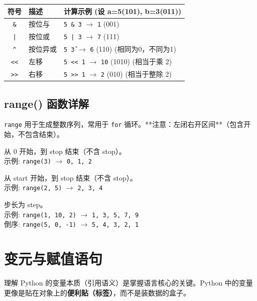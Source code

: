\documentclass[12pt, a4paper]{article}
\begin{document}
\begin{table}[ht]
\centering
\begin{tabular}{c l l}
\toprule
\textbf{符号} & \textbf{描述} & \textbf{计算示例 (设 a=5(101), b=3(011))} \\
\midrule
\texttt{\&} & 按位与 & \texttt{5 \& 3} $\to$ \texttt{1} (001) \\
\texttt{|} & 按位或 & \texttt{5 | 3} $\to$ \texttt{7} (111) \\
\texttt{\^} & 按位异或 & \texttt{5 \^ 3} $\to$ \texttt{6} (110) (相同为0，不同为1) \\
\texttt{<<} & 左移 & \texttt{5 << 1} $\to$ \texttt{10} (1010) (相当于乘 2) \\
\texttt{>>} & 右移 & \texttt{5 >> 1} $\to$ \texttt{2} (010) (相当于整除 2) \\
\bottomrule
\end{tabular}
\end{table}

\subsection{range() 函数详解}

\texttt{range} 用于生成整数序列，常用于 \texttt{for} 循环。**注意：左闭右开区间**（包含开始，不包含结束）。

\begin{description}[font=\ttfamily\bfseries]
    \item[range(stop)] 从 0 开始，到 stop 结束（不含 stop）。
        \\ 示例: \texttt{range(3)} $\to$ \texttt{0, 1, 2}
    \item[range(start, stop)] 从 start 开始，到 stop 结束（不含 stop）。
        \\ 示例: \texttt{range(2, 5)} $\to$ \texttt{2, 3, 4}
    \item[range(start, stop, step)] 步长为 step。
        \\ 示例: \texttt{range(1, 10, 2)} $\to$ \texttt{1, 3, 5, 7, 9}
        \\ 倒序: \texttt{range(5, 0, -1)} $\to$ \texttt{5, 4, 3, 2, 1}
\end{description}

\section{变元与赋值语句}

理解 Python 的变量本质（引用语义）是掌握语言核心的关键。Python 中的变量更像是贴在对象上的\textbf{便利贴（标签）}，而不是装数据的盒子。
\end{document}
